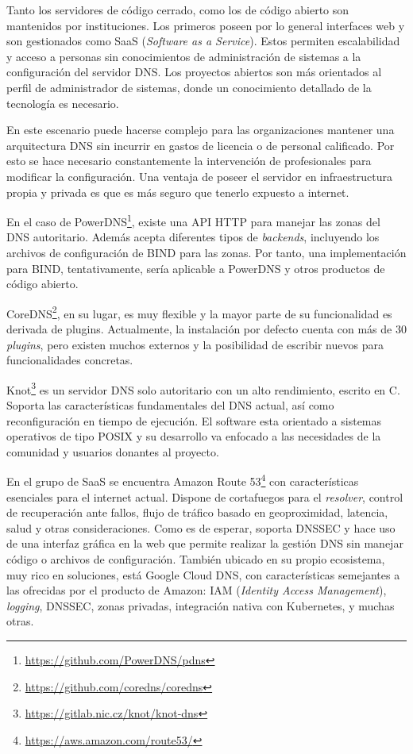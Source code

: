Tanto los servidores de código cerrado, como los de código abierto son mantenidos por instituciones. Los primeros poseen por lo general interfaces web y son gestionados como SaaS (\textit{Software as a Service}). Estos permiten escalabilidad y acceso a personas sin conocimientos de administración de sistemas a la configuración del servidor DNS. Los proyectos abiertos son más orientados al perfil de administrador de sistemas, donde un conocimiento detallado de la tecnología es necesario.

En este escenario puede hacerse complejo para las organizaciones mantener una arquitectura DNS sin incurrir en gastos de licencia o de personal calificado. Por esto se hace necesario constantemente la intervención de profesionales para modificar la configuración. Una ventaja de poseer el servidor en infraestructura propia y privada es que es más seguro que tenerlo expuesto a internet.

En el caso de PowerDNS\footnote{\url{https://github.com/PowerDNS/pdns}}, existe una API HTTP para manejar las zonas del DNS autoritario. Además acepta diferentes tipos de \textit{backends}, incluyendo los archivos de configuración de BIND para las zonas. Por tanto, una implementación para BIND, tentativamente, sería aplicable a PowerDNS y otros productos de código abierto.

CoreDNS\footnote{\url{https://github.com/coredns/coredns}}, en su lugar, es muy flexible y la mayor parte de su funcionalidad es derivada de plugins. Actualmente, la instalación por defecto cuenta con más de 30 \textit{plugins}, pero existen muchos externos y la posibilidad de escribir nuevos para funcionalidades concretas.

Knot\footnote{\url{https://gitlab.nic.cz/knot/knot-dns}} es un servidor DNS solo autoritario con un alto rendimiento, escrito en C. Soporta las características fundamentales del DNS actual, así como reconfiguración en tiempo de ejecución. El software esta orientado a sistemas operativos de tipo POSIX y su desarrollo va enfocado a las necesidades de la comunidad y usuarios donantes al proyecto.

En el grupo de SaaS se encuentra Amazon Route 53\footnote{\url{https://aws.amazon.com/route53/}} con características esenciales para el internet actual. Dispone de cortafuegos para el \textit{resolver}, control de recuperación ante fallos, flujo de tráfico basado en geoproximidad, latencia, salud y otras consideraciones. Como es de esperar, soporta DNSSEC y hace uso de una interfaz gráfica en la web que permite realizar la gestión DNS sin manejar código o archivos de configuración. También ubicado en su propio ecosistema, muy rico en soluciones, está Google Cloud DNS, con características semejantes a las ofrecidas por el producto de Amazon: IAM (\textit{Identity Access Management}), \textit{logging}, DNSSEC, zonas privadas, integración nativa con Kubernetes, y muchas otras.

